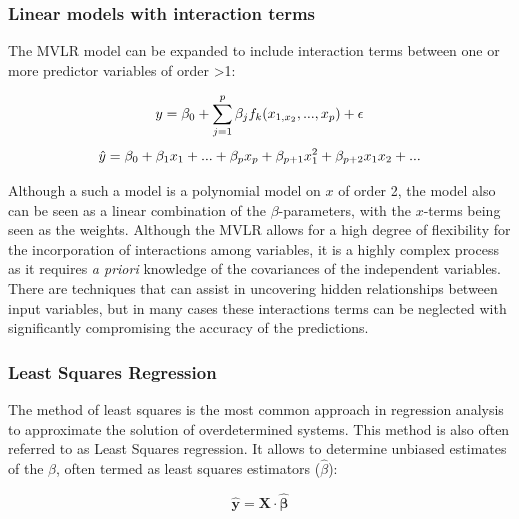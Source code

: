 \documentclass[12pt]{article}
\begin{document}
{\subsubsection{Linear models with interaction terms}
The MVLR model can be expanded to include interaction terms between one or more predictor variables of order >1:

\begin{equation} \label{eq:interaction_terms}
y  = \beta_{0} + \sum^{p}_{j=1} \beta_{j}f_{k}(x_{1, x_{2}}, ...,x_{p}) + \epsilon\\
\end{equation}
\begin{equation} \label{eq:interaction_terms2}
\hat y  = \beta_{0} + \beta_{1}x_{1} + ... + \beta_{p}x_{p} + \beta_{p+1}x_{1}^{2}+ \beta_{p+2}x_{1}x_{2} + ...  \\
\end{equation}

Although a such a model is a polynomial model on $x$ of order 2, the model also can be seen as a linear combination of the $\beta$-parameters, with the $x$-terms being seen as the weights. Although the MVLR allows for a high degree of flexibility for the incorporation of interactions among variables, it is a highly complex process as it requires \textit{a priori} knowledge of the covariances of the independent variables. There are techniques that can assist in uncovering hidden relationships between input variables, but in many cases these interactions terms can be neglected with significantly compromising the accuracy of the predictions.

\subsubsection{Least Squares Regression}

The method of least squares is the most common approach in regression analysis to approximate the solution of overdetermined systems. This method is also often referred to as Least Squares regression. It allows to determine unbiased estimates of the $\beta$, often termed as least squares estimators ($\hat \beta$): 
	
    \begin{equation} \label{eq:OLS} 
	\mathbf{\hat y} = \mathbf{X} \cdot \mathbf{\hat \beta} %
	\end{equation}
		
	
}
\end{document}
